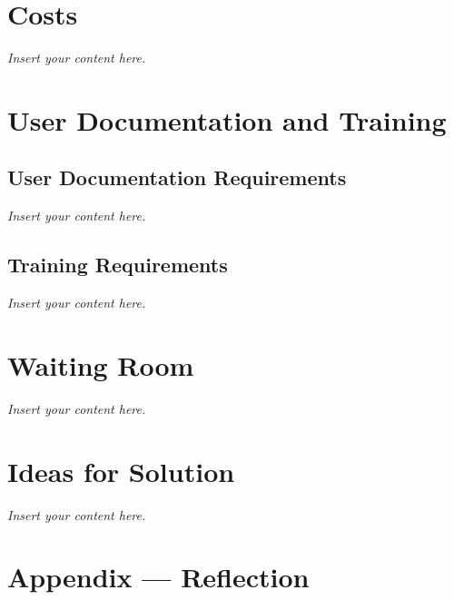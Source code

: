 \documentclass[12pt]{article}
\newcommand{\lips}{\textit{Insert your content here.}}
\begin{document}
\section{Costs}
\lips
\section{User Documentation and Training}
\subsection{User Documentation Requirements}
\lips
\subsection{Training Requirements}
\lips

\section{Waiting Room}
\lips

\section{Ideas for Solution}
\lips

\newpage{}
\section*{Appendix --- Reflection}




\end{document}
